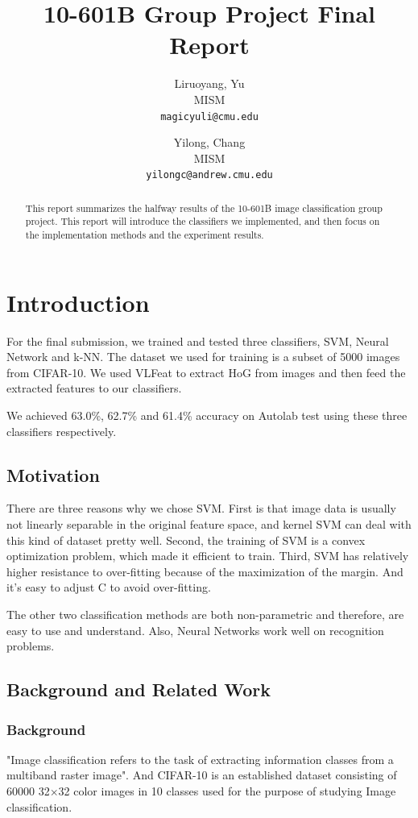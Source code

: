 \documentclass{article} %
\title{10-601B Group Project Final Report}
\author{
Liruoyang, Yu\\
MISM\\
\texttt{magicyuli@cmu.edu}
\and
Yilong, Chang\\
MISM\\
\texttt{yilongc@andrew.cmu.edu}
}
\begin{document}
\maketitle
\begin{abstract}
This report summarizes the halfway results of the 10-601B image classification group project. This report will introduce the classifiers we implemented, and then focus on the implementation methods and the experiment results.
\end{abstract}

\section{Introduction}
For the final submission, we trained and tested three classifiers, SVM,  Neural Network and k-NN. The dataset we used for training is a subset of 5000 images from CIFAR-10. We used VLFeat to extract HoG from images and then feed the extracted features to our classifiers.

We achieved 63.0\%, 62.7\% and 61.4\% accuracy on Autolab test using these three classifiers respectively.

\subsection{Motivation}

There are three reasons why we chose SVM. First is that image data is usually not linearly separable in the original feature space, and kernel SVM can deal with this kind of dataset pretty well. Second, the training of SVM is a convex optimization problem, which made it efficient to train. Third, SVM has relatively higher resistance to over-fitting because of the maximization of the margin. And it's easy to adjust C to avoid over-fitting.

The other two classification methods are both non-parametric and therefore, are easy to use and understand. Also, Neural Networks work well on recognition problems.

\subsection{Background and Related Work}
\subsubsection{Background}
"Image classification refers to the task of extracting information classes from a multiband raster image". And CIFAR-10 is an established dataset consisting of 60000 32$\times$32 color images in 10 classes used for the purpose of studying Image classification. 
\end{document}
